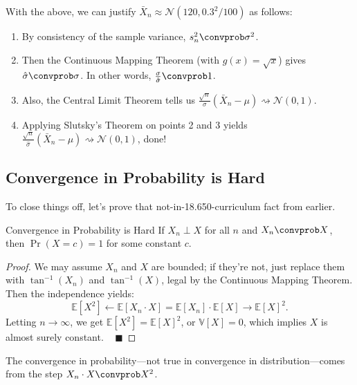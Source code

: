 With the above, we can justify $\bar{X}_n \approx \mathcal{N}(120, 0.3^2/100)$ as follows:
\begin{enumerate}
    \item By consistency of the sample variance, $s_n^2 \convprob \sigma^2$.
    \item Then the Continuous Mapping Theorem (with $g(x) = \sqrt{x}$)
    gives $\hat{\sigma} \convprob \sigma$.  In other words,
    $\frac{\sigma}{\hat{\sigma}} \convprob 1$.
    \item Also, the Central Limit Theorem tells us
    $\frac{\sqrt{n}}{\sigma} (\bar{X}_n - \mu) \rightsquigarrow \mathcal{N}(0, 1)$.
    \item Applying Slutsky's Theorem on points 2 and 3 yields
    $\frac{\sqrt{n}}{\hat{\sigma}} (\bar{X}_n - \mu) \rightsquigarrow \mathcal{N}(0, 1)$, done!
\end{enumerate}

\subsection{Convergence in Probability is Hard}

To close things off, let's prove that not-in-18.650-curriculum fact from earlier.

\begin{theorem}{Convergence in Probability is Hard}
    If $X_n \perp X$ for all $n$ and $X_n \convprob X$,
    then $\Pr(X = c) = 1$ for some constant $c$.
\end{theorem}

\begin{proof}
    We may assume $X_n$ and $X$ are bounded; if they're not,
    just replace them with $\tan^{-1}(X_n)$ and $\tan^{-1}(X)$,
    legal by the Continuous Mapping Theorem.  Then the independence yields:
    \[ \mathbb{E}[X^2] \leftarrow \mathbb{E}[X_n \cdot X] =
    \mathbb{E}[X_n] \cdot \mathbb{E}[X] \rightarrow \mathbb{E}[X]^2. \]
    Letting $n \to \infty$, we get $\mathbb{E}[X^2] = \mathbb{E}[X]^2$,
    or $\mathbb{V}[X] = 0$, which implies $X$ is almost surely constant. ~ $\blacksquare$
\end{proof}

\begin{remark}
    The convergence in probability---not true in convergence
    in distribution---comes from the step $X_n \cdot X \convprob X^2$.
\end{remark}

